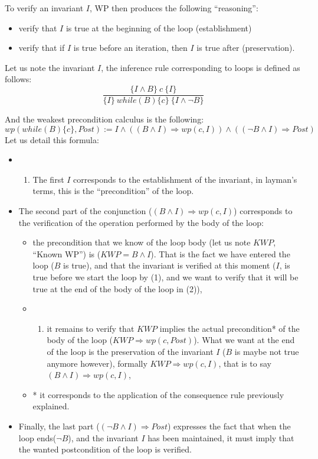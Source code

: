 To verify an invariant $I$, WP then produces the following
``reasoning'':
\begin{itemize}
\item
  verify that $I$ is true at the beginning of the loop (establishment)
\item
  verify that if $I$ is true before an iteration, then $I$ is true
  after (preservation).
\end{itemize}


Let us note the invariant $I$, the inference rule corresponding to
loops is defined as follows:
$$\dfrac{\{I \wedge B \}\ c\ \{I\}}{\{I\}\ while(B)\{c\}\ \{I \wedge \neg B\}}$$

And the weakest precondition calculus is the following:
$$wp(while (B) \{ c \}, Post) := I \wedge ((B \wedge I) \Rightarrow wp(c, I)) \wedge ((\neg B \wedge I) \Rightarrow Post)$$
Let us detail this formula:
\begin{itemize}
\item
  \begin{enumerate}
  \def\labelenumi{(\arabic{enumi})}
  \item
    The first $I$ corresponds to the establishment of the invariant,
    in layman's terms, this is the ``precondition'' of the loop.
  \end{enumerate}
\item
  The second part of the conjunction
  ($(B \wedge I) \Rightarrow wp(c, I)$) corresponds to the
  verification of the operation performed by the body of the loop:
  \begin{itemize}
  \item
    the precondition that we know of the loop body (let us note $KWP$,
    ``Known WP'') is ($KWP = B \wedge I$). That is the fact we have
    entered the loop ($B$ is true), and that the invariant is verified
    at this moment ($I$, is true before we start the loop by (1), and
    we want to verify that it will be true at the end of the body of the
    loop in (2)),
  \item
    \begin{enumerate}
    \def\labelenumi{(\arabic{enumi})}
    \setcounter{enumi}{1}
    \item
      it remains to verify that $KWP$ implies the actual precondition*
      of the body of the loop ($KWP \Rightarrow wp(c, Post)$). What we
      want at the end of the loop is the preservation of the invariant
      $I$ ($B$ is maybe not true anymore however), formally
      $KWP \Rightarrow wp(c, I)$, that is to say
      $(B \wedge I) \Rightarrow wp(c, I)$,
    \end{enumerate}
  \item
    * it corresponds to the application of the consequence rule
    previously explained.
  \end{itemize}
\item
  Finally, the last part ($(\neg B \wedge I) \Rightarrow Post$)
  expresses the fact that when the loop ends($\neg B$), and the
  invariant $I$ has been maintained, it must imply that the wanted
  postcondition of the loop is verified.
\end{itemize}

